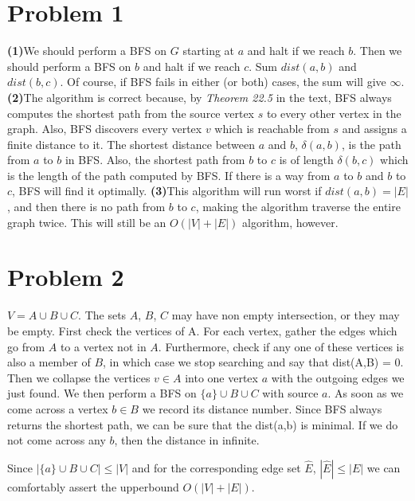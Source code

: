 \documentclass[10pt]{article}
\begin{document}
\section*{Problem 1}
\textbf{(1)}We should perform a BFS on $G$ starting at $a$ and halt if we reach $b$. Then we should perform a BFS on $b$ and halt if we reach $c$. Sum $dist(a,b)$ and $dist(b,c)$. Of course, if BFS fails in either (or both) cases, the sum will give $\infty$. \textbf{(2)}The algorithm is correct because, by \emph{Theorem 22.5} in the text, BFS always computes the shortest path from the source vertex $s$ to every other vertex in the graph. Also, BFS discovers every vertex $v$ which is reachable from $s$ and assigns a finite distance to it. The shortest distance between $a$ and $b$, $\delta(a, b)$, is the path from $a$ to $b$ in BFS. Also, the shortest path from $b$ to $c$ is of length $\delta(b,c)$ which is the length of the path computed by BFS. If there is a way from $a$ to $b$ and $b$ to $c$, BFS will find it optimally. \textbf{(3)}This algorithm will run worst if $dist(a,b) = |E|$, and then there is no path from $b$ to $c$, making the algorithm traverse the entire graph twice. This will still be an $O(|V| + |E|)$ algorithm, however.

\section*{Problem 2}
$V = A \cup B\cup C$. The sets $A$, $B$, $C$ may have non empty intersection, or they may be empty. First check the vertices of A. For each vertex, gather the edges which go from $A$ to a vertex not in $A$. Furthermore, check if any one of these vertices is also a member of $B$, in which case we stop searching and say that dist(A,B) = 0. Then we collapse the vertices $v\in A$ into one vertex $a$ with the outgoing edges we just found. 
We then perform a BFS on $\{a\}\cup B\cup C$ with source $a$. As soon as we come across a vertex $b \in B$ we record its distance number. Since BFS always returns the shortest path, we can be sure that the dist(a,b) is minimal. If we do not come across any $b$, then the distance in infinite. 

Since $|\{a\}\cup B\cup C| \le |V|$ and for the corresponding edge set $\hat{E}$, $|\hat{E}|\le|E|$ we can comfortably assert the upperbound $O(|V|+|E|)$.
\end{document}
